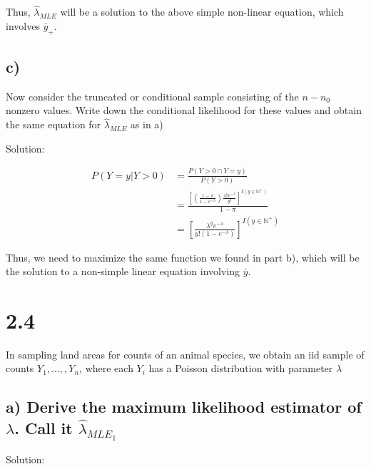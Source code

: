 \documentclass[
  letterpaper,
  DIV=11,
  numbers=noendperiod]{scrreprt}
\begin{document}
Thus, \(\hat{\lambda}_{MLE}\) will be a solution to the above simple
non-linear equation, which involves \(\bar{y}_+\).

\hypertarget{c}{%
\subsection{c)}\label{c}}

Now consider the truncated or conditional sample consisting of the
\(n- n_0\) nonzero values. Write down the conditional likelihood for
these values and obtain the same equation for \(\hat{\lambda}_{MLE}\) as
in a)

Solution:

\[
\begin{aligned}
P(Y=y |Y>0) &= \frac{P(Y>0 \cap Y=y)}{P(Y>0)} \\
&= \frac{
\left[\left( \frac{1-\pi}{1-e^{-\lambda}}\right)\frac{\lambda^y e^{-\lambda}}{y!}\right]^{I(y \in \mathbb{N}^+)}}{1-\pi}
\\
&= \left[\frac{\lambda^y e^{-\lambda}}{y!(1-e^{-\lambda})}\right]^{I(y \in \mathbb N^+)}
\end{aligned}
\]

Thus, we need to maximize the same function we found in part b), which
will be the solution to a non-simple linear equation involving
\(\bar{y}\).

\newpage

\hypertarget{section-2}{%
\section{2.4}\label{section-2}}

In sampling land areas for counts of an animal species, we obtain an iid
sample of counts \(Y_1, \dots, ,Y_n\), where each \(Y_i\) has a Poisson
distribution with parameter \(\lambda\)

\hypertarget{a-derive-the-maximum-likelihood-estimator-of-lambda.-call-it-hatlambda_mle_1}{%
\subsection{\texorpdfstring{a) Derive the maximum likelihood estimator
of \(\lambda\). Call it
\(\hat{\lambda}_{MLE_1}\)}{a) Derive the maximum likelihood estimator of \textbackslash lambda. Call it \textbackslash hat\{\textbackslash lambda\}\_\{MLE\_1\}}}\label{a-derive-the-maximum-likelihood-estimator-of-lambda.-call-it-hatlambda_mle_1}}

Solution:
\end{document}

